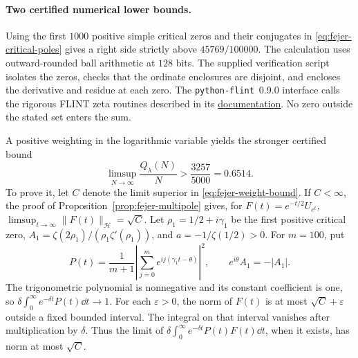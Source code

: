 \paragraph{Two certified numerical lower bounds.}
Using the first \(1000\) positive simple critical zeros and their
conjugates in \eqref{eq:fejer-critical-poles} gives a right side
strictly above \(45769/100000\). The calculation uses
outward-rounded ball arithmetic at \(128\) bits. The supplied
verification script isolates the zeros, checks that the ordinate
enclosures are disjoint, and encloses the derivative and residue
at each zero. The \texttt{python-flint}~0.9.0 interface calls
the rigorous FLINT zeta routines described in its
\href{https://flintlib.org/doc/acb_dirichlet/index.html\#zeros-of-the-riemann-zeta-function}%
{documentation}. No zero outside the stated set enters the sum.

A positive weighting in the logarithmic variable yields
the stronger certified bound
\begin{equation}\label{eq:fejer-weight-bound}
 \limsup_{N\to\infty}\frac{Q_\lambda(N)}{N}
 >\frac{3257}{5000}=0.6514.
\end{equation}
To prove it, let \(C\) denote the limit superior in
\eqref{eq:fejer-weight-bound}. If \(C<\infty\), the proof of
Proposition~\ref{prop:fejer-multipole} gives, for
\(F(t)=e^{-t/2}U_{e^t}\),
\(\limsup_{t\to\infty}\|F(t)\|_{\mathcal H}=\sqrt C\).
Let \(\rho_1=1/2+i\gamma_1\) be the first positive critical zero,
\(A_1=\zeta(2\rho_1)/(\rho_1\zeta'(\rho_1))\), and
\(a=-1/\zeta(1/2)>0\). For \(m=100\), put
\[
 P(t)=\frac{1}{m+1}
     \left|\sum_{j=0}^{m}e^{ij(\gamma_1t-\theta)}\right|^2,
 \qquad e^{i\theta}A_1=-|A_1|.
\]
The trigonometric polynomial is nonnegative and its constant
coefficient is one, so
\(\delta\int_0^\infty e^{-\delta t}P(t)\dd t\to1\).
For each \(\varepsilon>0\), the norm of \(F(t)\) is at most
\(\sqrt C+\varepsilon\) outside a fixed bounded interval. The
integral on that interval vanishes after multiplication by
\(\delta\). Thus the limit of
\(\delta\int_0^\infty e^{-\delta t}P(t)F(t)\dd t\), when it
exists, has norm at most \(\sqrt C\).

